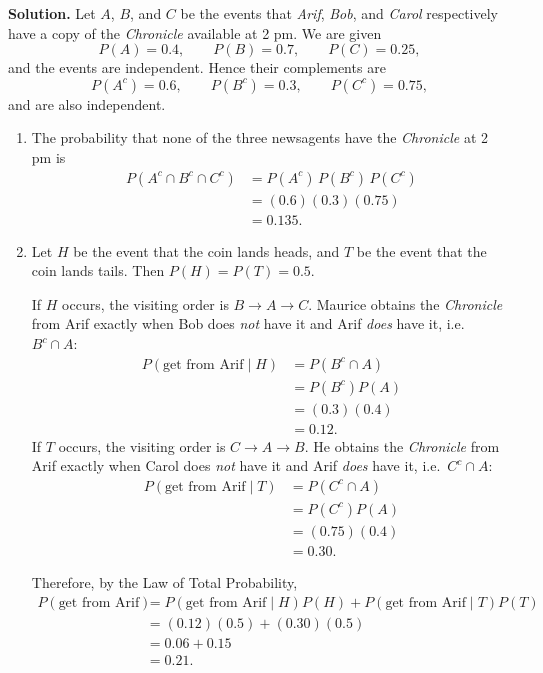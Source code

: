 \documentclass[12pt]{scrartcl}
\begin{document}
\begin{enumerate}[label=\textbf{\arabic*.}]
\medskip

\textbf{Solution.}
Let $A$, $B$, and $C$ be the events that \emph{Arif}, \emph{Bob}, and \emph{Carol} respectively have a copy of the
\textit{Chronicle} available at 2 pm. We are given
\[
P(A)=0.4,\qquad P(B)=0.7,\qquad P(C)=0.25,
\]
and the events are independent. Hence their complements are
\[
P(A^c)=0.6,\qquad P(B^c)=0.3,\qquad P(C^c)=0.75,
\]
and are also independent.

\begin{enumerate}[label=(\alph*)]
\item The probability that none of the three newsagents have the \textit{Chronicle} at 2 pm is
\begin{align*}
P(A^c\cap B^c\cap C^c)
&=P(A^c)\,P(B^c)\,P(C^c)\\
&=(0.6)(0.3)(0.75)\\
&=0.135.
\end{align*}

\item Let $H$ be the event that the coin lands heads, and $T$ be the event that the coin lands tails.
Then $P(H)=P(T)=0.5$.

\medskip

If $H$ occurs, the visiting order is $B \to A \to C$. Maurice obtains the \textit{Chronicle} from Arif
exactly when Bob does \emph{not} have it and Arif \emph{does} have it, i.e.\ $B^c\cap A$:
\begin{align*}
    P(\text{get from Arif}\mid H) & = P(B^c\cap A) \\
    & = P(B^c)P(A) \\
    & =(0.3)(0.4) \\ 
    & =0.12.
\end{align*}
\medskip
If $T$ occurs, the visiting order is $C \to A \to B$. He obtains the \textit{Chronicle} from Arif
exactly when Carol does \emph{not} have it and Arif \emph{does} have it, i.e.\ $C^c\cap A$:
\begin{align*}
    P(\text{get from Arif}\mid T) & = P(C^c\cap A) \\
    & = P(C^c)P(A) \\
    & =(0.75)(0.4) \\
    & = 0.30.
\end{align*}

Therefore, by the Law of Total Probability,
\begin{align*}
P(\text{get from Arif})
&=P(\text{get from Arif}\mid H)P(H)+P(\text{get from Arif}\mid T)P(T)\\
&=(0.12)(0.5)+(0.30)(0.5)\\
&=0.06+0.15\\
&=0.21.
\end{align*}
\end{enumerate}



\end{enumerate}
\end{document}
